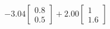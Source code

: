 \documentclass[preview]{standalone}
\begin{document}
\begin{align*}
-3.04 \begin{bmatrix} 0.8 \\ 0.5 \end{bmatrix} + 2.00 \begin{bmatrix} 1 \\ 1.6 \end{bmatrix}
\end{align*}
\end{document}
